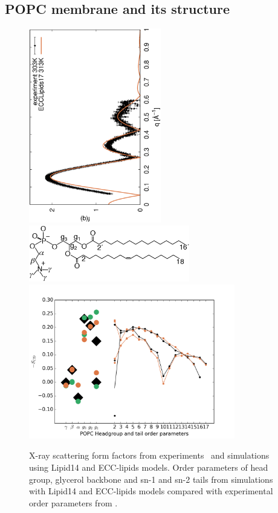\documentclass[aip,jcp,twocolumn]{revtex4}
\begin{document}
\subsection{POPC membrane and its structure}

\begin{figure}[tbp]
  \centering
  \includegraphics[height=8.5cm,angle=-90]{../Fig/form-f_exp-l14-eccl17.eps}
  \includegraphics[width=7.0cm]{../Fig/POPCstructure.eps}
  \includegraphics[width=9.0cm]{../Fig/ipython_nb/Order-parameters_exp-L14-ECCL17_q80_sig89.png}
  \caption{\label{simVSexpNOions}
    X-ray scattering form factors from experiments~\cite{Kucerka2011} and simulations using Lipid14 \cite{dickson14} and ECC-lipids models. 
    Order parameters of head group, glycerol backbone and sn-1 and sn-2 tails  from simulations with Lipid14 \cite{dickson14} and ECC-lipids models
    compared with experimental order parameters from \cite{ferreira13}.}
\end{figure}
\end{document}
